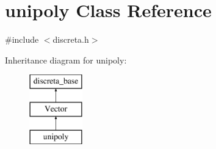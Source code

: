 \hypertarget{classunipoly}{}\section{unipoly Class Reference}
\label{classunipoly}


{\ttfamily \#include $<$discreta.\+h$>$}

Inheritance diagram for unipoly\+:\begin{figure}[H]
\begin{center}
\leavevmode
\includegraphics[height=3.000000cm]{classunipoly}
\end{center}
\end{figure}
